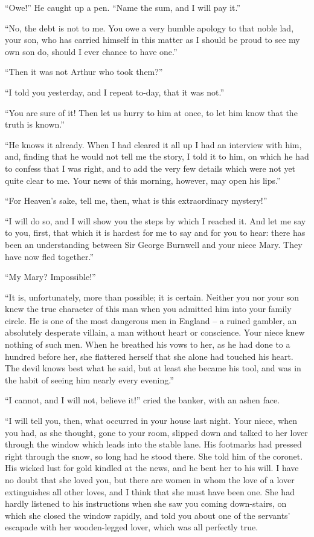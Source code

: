 “Owe!” He caught up a pen. “Name the sum, and I
will pay it.”

“No, the debt is not to me. You owe a very humble
apology to that noble lad, your son, who has carried himself
in this matter as I should be proud to see my own son do,
should I ever chance to have one.”

“Then it was not Arthur who took them?”

“I told you yesterday, and I repeat to-day, that it was not.”

“You are sure of it! Then let us hurry to him at once, to
let him know that the truth is known.”

“He knows it already. When I had cleared it all up I had
an interview with him, and, finding that he would not tell me
the story, I told it to him, on which he had to confess that I
was right, and to add the very few details which were not yet
quite clear to me. Your news of this morning, however, may
open his lips.”

“For Heaven’s sake, tell me, then, what is this extraordinary
mystery!”

“I will do so, and I will show you the steps by which I
reached it. And let me say to you, first, that which it is
hardest for me to say and for you to hear: there has been
an understanding between Sir George Burnwell and your niece
Mary. They have now fled together.”

“My Mary? Impossible!”

“It is, unfortunately, more than possible; it is certain.
Neither you nor your son knew the true character of this man
when you admitted him into your family circle. He is one of
the most dangerous men in England -- a ruined gambler, an
absolutely desperate villain, a man without heart or conscience.
Your niece knew nothing of such men. When he
breathed his vows to her, as he had done to a hundred before
her, she flattered herself that she alone had touched his
heart. The devil knows best what he said, but at least she
became his tool, and was in the habit of seeing him nearly
every evening.”

“I cannot, and I will not, believe it!” cried the banker, with
an ashen face.

“I will tell you, then, what occurred in your house last
night. Your niece, when you had, as she thought, gone to your
room, slipped down and talked to her lover through the window
which leads into the stable lane. His footmarks had pressed
right through the snow, so long had he stood there. She told
him of the coronet. His wicked lust for gold kindled at the
news, and he bent her to his will. I have no doubt that she
loved you, but there are women in whom the love of a lover
extinguishes all other loves, and I think that she must have
been one. She had hardly listened to his instructions when
she saw you coming down-stairs, on which she closed the window
rapidly, and told you about one of the servants’ escapade
with her wooden-legged lover, which was all perfectly true.

